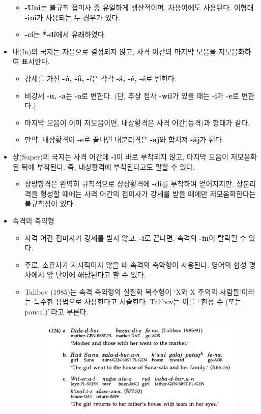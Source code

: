 \begin{itemize}
\begin{itemize}
\item \textbf{-Uni}는 불규칙 접미사 중 유일하게 생산적이며, 차용어에도 사용된다. 이형태 \textbf{-ini}가 사용되는 두 경우가 있다.
\item \textbf{-cí}는 \textbf{*-dí}에서 유래하였다.
\end{itemize}
\item 내(In)의 국지는 자음으로 결정되지 않고, 사격 어간의 마지막 모음을 저모음화하여 표시한다.
\begin{itemize}
\item 강세를 가진 \textbf{-ú, -\'ü, -í}은 각각 \textbf{-á, -é, -é}로 변한다.
\item 비강세 \textbf{-u, -a}는 \textbf{-a}로 변한다. (단, 추상 접사 \textbf{-wil}가 있을 때는 \textbf{-i}가 \textbf{-e}로 변한다.)
\item 마지막 모음이 이미 저모음이면, 내상황격은 사격 어간(능격)과 형태가 같다.
\item 만약, 내상황격이 \textbf{-e}로 끝나면 내분리격은 \textbf{-aj}와 합쳐져 \textbf{-äj}가 된다.
\end{itemize}
\item 상(Super)의 국지는 사격 어간에 \textbf{-l}이 바로 부착되지 않고, 마지막 모음이 저모음화 된 뒤에 부착된다. 즉, 내상황격에 부착된다고도 말할 수 있다.
\begin{itemize}
\item 상방향격은 완벽히 규칙적으로 상상황격에 \textbf{-di}를 부착하여 얻어지지만, 상분리격을 형성할 때에는 사격 어간의 접미사가 강세를 받을 때에만 저모음화한다는 불규칙성이 있다.
\end{itemize}
\item 속격의 축약형
\begin{itemize}
\item 사격 어간 접미사가 강세를 받지 않고, \textbf{-i}로 끝나면, 속격의 \textbf{-in}이 탈락될 수 있다. 
\item 주로, 소유자가 지시적이지 않을 때 속격의 축약형이 사용된다. 영어의 합성 명사에서 앞 단어에 해당된다고 할 수 있다.
\item Talibov (1985)는  속격 축약형의 실질화 복수형이 `X와 X 주의의 사람들'이라는 특수한 용법으로 사용한다고 서술한다. Talibov는 이를 ``한정 수 (또는 paucal)''라고 부른다.
\begin{figure}[H]
\centerline{\includegraphics[width=.8\linewidth]{Lezgian/src/ex124.png}}
\end{figure}
\end{itemize}
\end{itemize}

